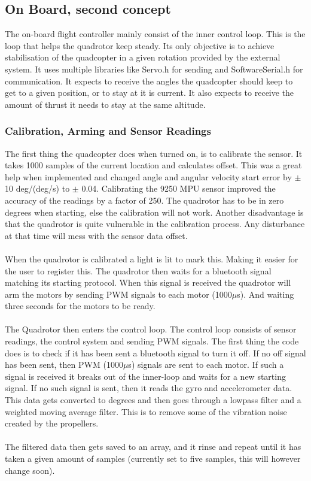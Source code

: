 \subsection{On Board, second concept}
The on-board flight controller mainly consist of the inner control loop. This is the loop that helps the quadrotor keep steady. Its only objective is to achieve  stabilisation of the quadcopter in a given rotation provided by the external system. It uses multiple libraries like Servo.h for sending and SoftwareSerial.h for communication. It expects to receive the angles the quadcopter should keep to get to a given position, or to stay at it is current. It also expects to receive the amount of thrust it needs to stay at the same altitude. 

\subsubsection{Calibration, Arming and Sensor Readings}
The first thing the quadcopter does when turned on, is to calibrate the sensor. It takes 1000 samples of the current location and calculates offset. This was a great help when implemented and changed angle and angular velocity start error by $\pm$ 10 deg/(deg/s) to $\pm$ 0.04. Calibrating the 9250 MPU sensor improved the accuracy of the readings by a factor of 250. The quadrotor has to be in zero degrees when starting, else the calibration will not work. Another disadvantage is that the quadrotor is quite vulnerable in the calibration process. Any disturbance at that time will mess with the sensor data offset.
\\\\
When the quadrotor is calibrated a light is lit to mark this. Making it easier for the user to register this. The quadrotor then waits for a bluetooth signal matching its starting protocol. When this signal is received the quadrotor will arm the motors by sending PWM signals to each motor (1000$\mu$s). And waiting three seconds for the motors to be ready. 
\\\\
The Quadrotor then enters the control loop. The control loop consists of sensor readings, the control system and sending PWM signals. The first thing the code does is to check if it has been sent a bluetooth signal to turn it off. If no off signal has been sent, then PWM (1000$\mu$s) signals are sent to each motor. If such a signal is received it breaks out of the inner-loop and waits for a new starting signal. If no such signal is sent, then it reads the gyro and accelerometer data. This data gets converted to degrees and then goes through a lowpass filter and a weighted moving average filter. This is to remove some of the vibration noise created by the propellers. 
\\\\
The filtered data then gets saved to an array, and it rinse and repeat until it has taken a given amount of samples (currently set to five samples, this will however change soon). \\
\newpage
